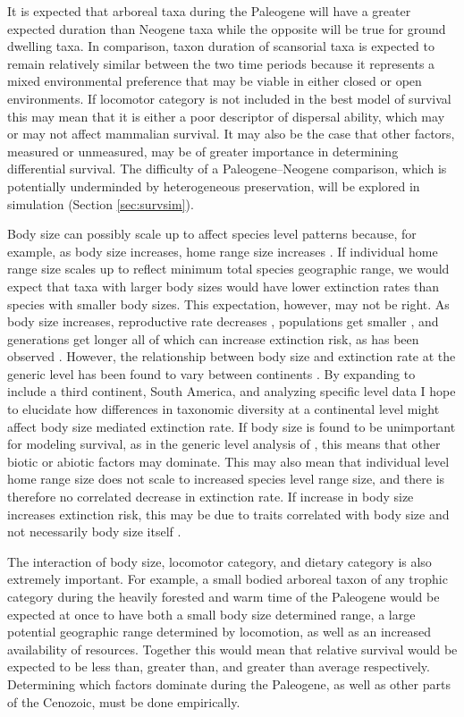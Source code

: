 \documentclass[12pt,letterpaper]{article}
\begin{document}
It is expected that arboreal taxa during the Paleogene will have a greater expected duration than Neogene taxa while the opposite will be true for ground dwelling taxa. In comparison, taxon duration of scansorial taxa is expected to remain relatively similar between the two time periods because it represents a mixed environmental preference that may be viable in either closed or open environments. If locomotor category is not included in the best model of survival this may mean that it is either a poor descriptor of dispersal ability, which may or may not affect mammalian survival. It may also be the case that other factors, measured or unmeasured, may be of greater importance in determining differential survival. The difficulty of a Paleogene--Neogene comparison, which is potentially underminded by heterogeneous preservation, will be explored in simulation (Section \ref{sec:survsim}).

Body size can possibly scale up to affect species level patterns because, for example, as body size increases, home range size increases \citep{Damuth1979}. If individual home range size scales up to reflect minimum total species geographic range, we would expect that taxa with larger body sizes would have lower extinction rates than species with smaller body sizes. This expectation, however, may not be right. As body size increases, reproductive rate decreases \citep{Johnson2002b}, populations get smaller \citep{White2007}, and generations get longer \citep{Martin1993a} all of which can increase extinction risk, as has been observed \citep{Liow2008,Davidson2012}. However, the relationship between body size and extinction rate at the generic level has been found to vary between continents \citep{Tomiya2013,Liow2008}. By expanding to include a third continent, South America, and analyzing specific level data I hope to elucidate how differences in taxonomic diversity at a continental level might affect body size mediated extinction rate. If body size is found to be unimportant for modeling survival, as in the generic level analysis of \citet{Tomiya2013}, this means that other biotic or abiotic factors may dominate. This may also mean that individual level home range size does not scale to increased species level range size, and there is therefore no correlated decrease in extinction rate. If increase in body size increases extinction risk, this may be due to traits correlated with body size and not necessarily body size itself \citep{Johnson2002b}.

The interaction of body size, locomotor category, and dietary category is also extremely important. For example, a small bodied arboreal taxon of any trophic category during the heavily forested and warm time of the Paleogene would be expected at once to have both a small body size determined range, a large potential geographic range determined by locomotion, as well as an increased availability of resources. Together this would mean that relative survival would be expected to be less than, greater than, and greater than average respectively. Determining which factors dominate during the Paleogene, as well as other parts of the Cenozoic, must be done empirically.
\end{document}
